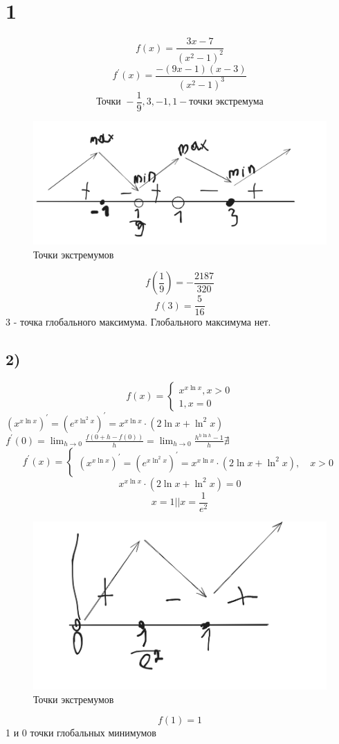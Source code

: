 

    \section*{1}{
    $$f(x) =\frac{3x-7}{(x^2-1)^2}$$
    $$f^{'}(x) = \frac{-(9x-1)(x-3)}{(x^2-1)^3}  $$
    $$\text{Точки }-\frac19, 3, -1,1 - \text{точки экстремума}$$
    \begin{figure}[h]
    	
    	\centering
    	
    	\includegraphics[width=0.8\linewidth]{Screenshot from 2024-01-15 20-13-23.png}
    	
    	\caption{Точки экстремумов}
    	
    	\label{fig:mpr}
    	
    \end{figure}
$$f(\frac19) = -\frac{2187}{320}$$
$$f(3) = \frac{5}{16}$$
3 - точка глобального максимума. Глобального максимума нет.
\subsection*{2)}
$$f(x) = \begin{cases*}x^{x\ln x}, x>0 \\
   1, x = 0\end{cases*}$$
   $(x^{x\ln x})^{'} = (e^{x\ln^2x})^{'} = x^{x\ln x}\cdot(2\ln x + \ln^2x ) $\\
   $f^{'}(0) = \lim_{h\to 0}\frac{f(0+h-f(0))}{h} = \lim_{h\to0} \frac{h^{h\ln h}-1}{h} \nexists$
   $$f^{'}(x) = \begin{cases*}
 (x^{x\ln x})^{'} = (e^{x\ln^2x})^{'} = x^{x\ln x}\cdot(2\ln x + \ln^2x ) , \quad x>0
   \end{cases*}$$
   $$x^{x\ln x}\cdot(2\ln x + \ln^2x ) = 0$$
   $$x = 1 || x = \frac{1}{e^2}$$
       \begin{figure}[h]
   	
   	\centering
   	
   	\includegraphics[width=0.8\linewidth]{Screenshot from 2024-01-15 20-35-33.png}
   	\caption{Точки экстремумов}
   	\label{fig:mpr}
   \end{figure}
   $$f(1) = 1$$
   1 и 0 точки глобальных минимумов
}
